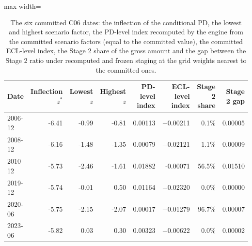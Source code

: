 \begin{table}[htbp]
\centering
\small
\caption{The six committed C06 dates: the inflection of the conditional PD, the lowest and highest scenario factor, the PD-level index recomputed by the engine from the committed scenario factors (equal to the committed value), the committed ECL-level index, the Stage 2 share of the gross amount and the gap between the Stage 2 ratio under recomputed and frozen staging at the grid weights nearest to the committed ones.}
\label{tab:committed-nonlinearity}
\begin{adjustbox}{max width=\textwidth}
\begin{tabular}{lrrrrrrr}
\toprule
Date & Inflection $z^*$ & Lowest $z$ & Highest $z$ & PD-level index & ECL-level index & Stage 2 share & Stage 2 gap \\
\midrule
2006-12 & -6.41 & -0.99 & -0.81 & 0.00113 & +0.00211 & 0.1\% & 0.00005 \\
2008-12 & -6.16 & -1.48 & -1.35 & 0.00079 & +0.02121 & 1.1\% & 0.00009 \\
2010-12 & -5.73 & -2.46 & -1.61 & 0.01882 & -0.00071 & 56.5\% & 0.01510 \\
2019-12 & -5.74 & -0.01 & 0.50 & 0.01164 & +0.02320 & 0.0\% & 0.00000 \\
2020-06 & -5.75 & -2.15 & -2.07 & 0.00017 & +0.01279 & 96.7\% & 0.00007 \\
2023-06 & -5.82 & 0.03 & 0.30 & 0.00323 & +0.00622 & 0.0\% & 0.00002 \\
\bottomrule
\end{tabular}
\end{adjustbox}
\end{table}
